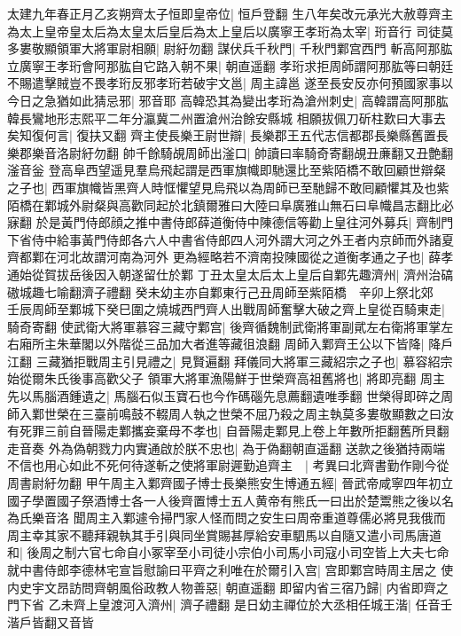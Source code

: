太建九年春正月乙亥朔齊太子恒即皇帝位|{
	恒戶登翻}
生八年矣改元承光大赦尊齊主為太上皇帝皇太后為太皇太后皇后為太上皇后以廣寧王孝珩為太宰|{
	珩音行}
司徒莫多婁敬顯領軍大將軍尉相願|{
	尉紆勿翻}
謀伏兵千秋門|{
	千秋門鄴宫西門}
斬高阿那肱立廣寧王孝珩會阿那肱自它路入朝不果|{
	朝直遥翻}
孝珩求拒周師謂阿那肱等曰朝廷不賜遣擊賊豈不畏孝珩反邪孝珩若破宇文邕|{
	周主諱邕}
遂至長安反亦何預國家事以今日之急猶如此猜忌邪|{
	邪音耶}
高韓恐其為變出孝珩為滄州刺史|{
	高韓謂高阿那肱韓長鸞地形志熙平二年分瀛冀二州置滄州治餘安縣城}
相願拔佩刀斫柱歎曰大事去矣知復何言|{
	復扶又翻}
齊主使長樂王尉世辯|{
	長樂郡王五代志信都郡長樂縣舊置長樂郡樂音洛尉紆勿翻}
帥千餘騎覘周師出滏口|{
	帥讀曰率騎奇寄翻覘丑亷翻又丑艶翻滏音釡}
登高阜西望遥見羣烏飛起謂是西軍旗幟即馳還比至紫陌橋不敢回顧世辯粲之子也|{
	西軍旗幟皆黑齊人時恇懼望見烏飛以為周師已至馳歸不敢囘顧懼其及也紫陌橋在鄴城外尉粲與高歡同起於北鎮爾雅曰大陸曰阜廣雅山無石曰阜幟昌志翻比必寐翻}
於是黃門侍郎顔之推中書侍郎薛道衡侍中陳德信等勸上皇往河外募兵|{
	齊制門下省侍中給事黃門侍郎各六人中書省侍郎四人河外謂大河之外王者内京師而外諸夏齊都鄴在河北故謂河南為河外}
更為經略若不濟南投陳國從之道衡孝通之子也|{
	薛孝通始從賀拔岳後因入朝遂留仕於鄴}
丁丑太皇太后太上皇后自鄴先趣濟州|{
	濟州治碻磝城趣七喻翻濟子禮翻}
癸未幼主亦自鄴東行己丑周師至紫陌橋　辛卯上祭北郊　壬辰周師至鄴城下癸巳圍之燒城西門齊人出戰周師奮擊大破之齊上皇從百騎東走|{
	騎奇寄翻}
使武衛大將軍慕容三藏守鄴宫|{
	後齊循魏制武衛將軍副貮左右衛將軍掌左右廂所主朱華閣以外階從三品加大者進等藏徂浪翻}
周師入鄴齊王公以下皆降|{
	降戶江翻}
三藏猶拒戰周主引見禮之|{
	見賢遍翻}
拜儀同大將軍三藏紹宗之子也|{
	慕容紹宗始從爾朱氏後事高歡父子}
領軍大將軍漁陽鮮于世榮齊高祖舊將也|{
	將即亮翻}
周主先以馬腦酒鍾遺之|{
	馬腦石似玉寶石也今作碼碯先息薦翻遺唯季翻}
世榮得即碎之周師入鄴世榮在三臺前鳴鼓不輟周人執之世榮不屈乃殺之周主執莫多婁敬顯數之曰汝有死罪三前自晉陽走鄴攜妾棄母不孝也|{
	自晉陽走鄴見上卷上年數所拒翻舊所貝翻走音奏}
外為偽朝戮力内實通啟於朕不忠也|{
	為于偽翻朝直遥翻}
送款之後猶持兩端不信也用心如此不死何待遂斬之使將軍尉遲勤追齊主　|{
	考異曰北齊書勤作剛今從周書尉紆勿翻}
甲午周主入鄴齊國子博士長樂熊安生博通五經|{
	晉武帝咸寧四年初立國子學置國子祭酒博士各一人後齊置博士五人黄帝有熊氏一曰出於楚鬻熊之後以名為氏樂音洛}
聞周主入鄴遽令掃門家人怪而問之安生曰周帝重道尊儒必將見我俄而周主幸其家不聽拜親執其手引與同坐賞賜甚厚給安車駟馬以自隨又遣小司馬唐道和|{
	後周之制六官七命自小冢宰至小司徒小宗伯小司馬小司寇小司空皆上大夫七命}
就中書侍郎李德林宅宣旨慰諭曰平齊之利唯在於爾引入宫|{
	宫即鄴宫時周主居之}
使内史宇文昂訪問齊朝風俗政教人物善惡|{
	朝直遥翻}
即留内省三宿乃歸|{
	内省即齊之門下省}
乙未齊上皇渡河入濟州|{
	濟子禮翻}
是日幼主禪位於大丞相任城王湝|{
	任音壬湝戶皆翻又音皆}
